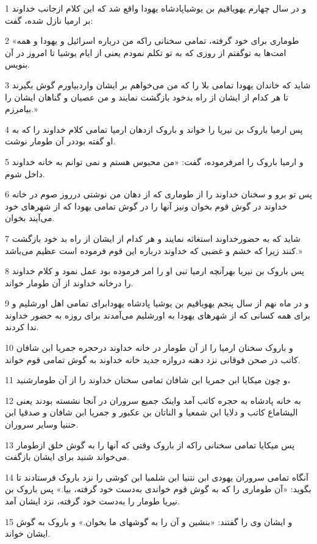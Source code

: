 \par 1 و در سال چهارم یهویاقیم بن یوشیاپادشاه یهودا واقع شد که این کلام ازجانب خداوند بر ارمیا نازل شده، گفت:
\par 2 «طوماری برای خود گرفته، تمامی سخنانی راکه من درباره اسرائیل و یهودا و همه امت‌ها به توگفتم از روزی که به تو تکلم نمودم یعنی از ایام یوشیا تا امروز در آن بنویس.
\par 3 شاید که خاندان یهودا تمامی بلا را که من می‌خواهم بر ایشان واردبیاورم گوش بگیرند تا هر کدام از ایشان از راه بدخود بازگشت نمایند و من عصیان و گناهان ایشان را بیامرزم.»
\par 4 پس ارمیا باروک بن نیریا را خواند و باروک ازدهان ارمیا تمامی کلام خداوند را که به او گفته بوددر آن طومار نوشت.
\par 5 و ارمیا باروک را امرفرموده، گفت: «من محبوس هستم و نمی توانم به خانه خداوند داخل شوم.
\par 6 پس تو برو و سخنان خداوند را از طوماری که از دهان من نوشتی درروز صوم در خانه خداوند در گوش قوم بخوان ونیز آنها را در گوش تمامی یهودا که از شهرهای خود می‌آیند بخوان.
\par 7 شاید که به حضورخداوند استغاثه نمایند و هر کدام از ایشان از راه بد خود بازگشت کنند زیرا که خشم و غضبی که خداوند درباره این قوم فرموده است عظیم می‌باشد.»
\par 8 پس باروک بن نیریا بهر‌آنچه ارمیا نبی او را امر فرموده بود عمل نمود و کلام خداوند را درخانه خداوند از آن طومار خواند.
\par 9 و در ماه نهم از سال پنجم یهویاقیم بن یوشیا پادشاه یهودابرای تمامی اهل اورشلیم و برای همه کسانی که از شهرهای یهودا به اورشلیم می‌آمدند برای روزه به حضور خداوند ندا کردند.
\par 10 و باروک سخنان ارمیا را از آن طومار در خانه خداوند درحجره جمریا ابن شافان کاتب در صحن فوقانی نزد دهنه دروازه جدید خانه خداوند به گوش تمامی قوم خواند.
\par 11 و چون میکایا ابن جمریا ابن شافان تمامی سخنان خداوند را از آن طومارشنید،
\par 12 به خانه پادشاه به حجره کاتب آمد واینک جمیع سروران در آنجا نشسته بودند یعنی الیشاماع کاتب و دلایا ابن شمعیا و الناتان بن عکبور و جمریا ابن شافان و صدقیا ابن حننیا وسایر سروران.
\par 13 پس میکایا تمامی سخنانی راکه از باروک وقتی که آنها را به گوش خلق ازطومار می‌خواند شنید برای ایشان باز‌گفت.
\par 14 آنگاه تمامی سروران یهودی ابن نتنیا ابن شلمبا ابن کوشی را نزد باروک فرستادند تا بگوید: «آن طوماری را که به گوش قوم خواندی به‌دست خود گرفته، بیا.» پس باروک بن نیریا طومار را به‌دست خود گرفته، نزد ایشان آمد. 
\par 15 و ایشان وی را گفتند: «بنشین و آن را به گوشهای ما بخوان.» و باروک به گوش ایشان خواند.
